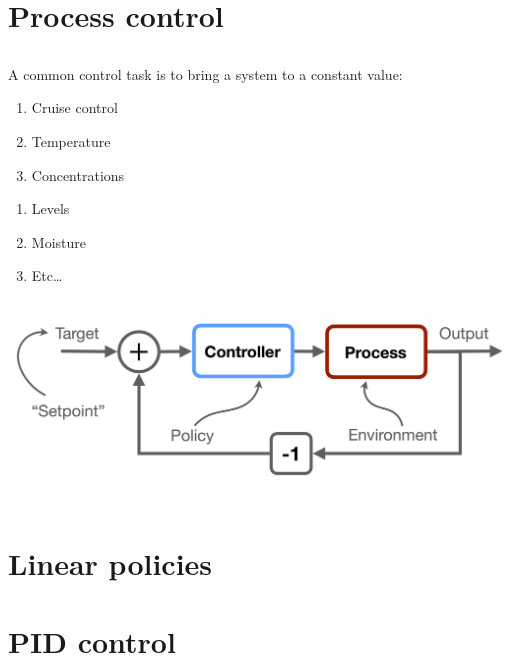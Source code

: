 \documentclass[
  letterpaper,
  DIV=11,
  numbers=noendperiod,
  oneside]{scrartcl}
\providecommand{\tightlist}{%
  \setlength{\itemsep}{0pt}\setlength{\parskip}{0pt}}\usepackage{longtable,booktabs,array}
\begin{document}
\section{Process control}\label{process-control}

\subsection{}\label{section-22}

A common control task is to bring a system to a constant value:

\begin{enumerate}
\def\labelenumi{\arabic{enumi}.}
\tightlist
\item
  Cruise control
\item
  Temperature
\item
  Concentrations
\end{enumerate}

\begin{enumerate}
\def\labelenumi{\arabic{enumi}.}
\setcounter{enumi}{3}
\tightlist
\item
  Levels
\item
  Moisture
\item
  Etc\ldots{}
\end{enumerate}

\begin{center}
\includegraphics[width=\textwidth,height=2.08333in]{figs/feedback_diagram.png}
\end{center}

\section{Linear policies}\label{linear-policies}

\section{PID control}\label{pid-control}
\end{document}
